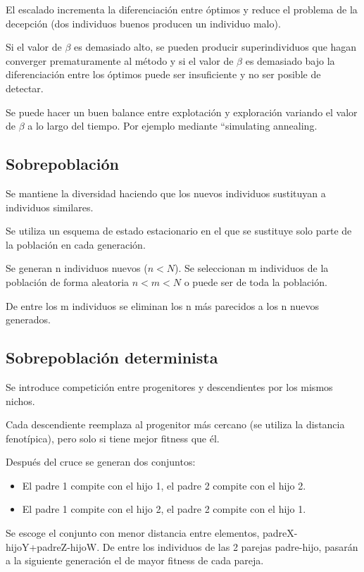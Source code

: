 \documentclass[12pt, twoside, openright]{report} %
\begin{document}
El escalado incrementa la diferenciación entre óptimos y reduce el problema de la decepción (dos individuos buenos producen un individuo malo).

Si el valor de $\beta$ es demasiado alto, se pueden producir superindividuos que hagan converger prematuramente al método y si el valor de $\beta$ es demasiado bajo la diferenciación entre los óptimos puede ser insuficiente y no ser posible de detectar.

Se puede hacer un buen balance entre explotación y exploración variando el valor de $\beta$ a lo largo del tiempo. Por ejemplo mediante “simulating annealing.

\subsection{Sobrepoblación}
Se mantiene la diversidad haciendo que los nuevos individuos sustituyan a individuos similares.

Se utiliza un esquema de estado estacionario en el que se sustituye solo parte de la población en cada generación.

Se generan n individuos nuevos ($n < N$). Se seleccionan m individuos de la población de forma aleatoria $n < m < N$ o puede ser de toda la población.

De entre los m individuos se eliminan los n más parecidos a los n nuevos generados.

\subsection{Sobrepoblación determinista}
Se introduce competición entre progenitores y descendientes por los mismos nichos.

Cada descendiente reemplaza al progenitor más cercano (se utiliza la distancia fenotípica), pero solo si tiene mejor fitness que él.

Después del cruce se generan dos conjuntos:
\begin{itemize}
	\item El padre 1 compite con el hijo 1, el padre 2 compite con el hijo 2.
	\item El padre 1 compite con el hijo 2, el padre 2 compite con el hijo	1.
\end{itemize}

Se escoge el conjunto con menor distancia entre elementos, padreX-hijoY+padreZ-hijoW. De entre los individuos de las 2 parejas padre-hijo, pasarán a la siguiente generación el de mayor fitness de cada pareja.
\end{document}

